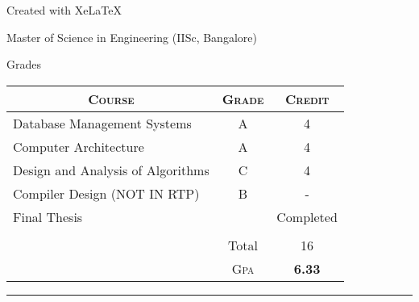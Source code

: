 \documentclass[a4paper,10pt]{article} %
\begin{document}
\vfill

\centerline{Created with Xe\LaTeX\ }

\iffalse

\newpage


\par{\centering\Large \hypertarget{iisc}{Master of Science in  Engineering (IISc, Bangalore)}\par}\large{\centering Grades\par}\normalsize

\begin{center}
\begin{tabular}{lcc}
\multicolumn{1}{c}{\textsc{Course}} & \textsc{Grade}&\textsc{Credit}\\ \hline
Database Management Systems & A & 4\\
Computer Architecture & A & 4\\
Design and Analysis of Algorithms & C & 4\\
Compiler Design (NOT IN RTP) & B & -\\
Final Thesis &  & Completed \\
&&\\
& Total & 16\\\cline{2-3}
&\textsc{Gpa}&\textbf{6.33}
\end{tabular}
\end{center}
\bigskip
\hrule
\bigskip


\bigskip
\end{document}
